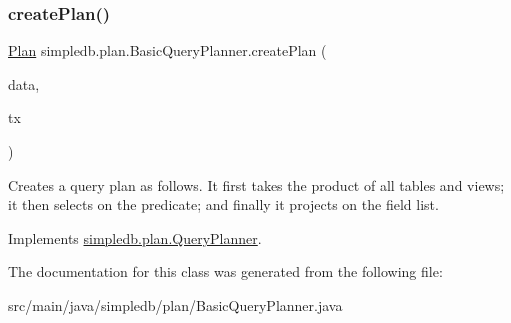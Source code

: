 \subsubsection{\texorpdfstring{create\+Plan()}{createPlan()}}
{\footnotesize\ttfamily \hyperlink{interfacesimpledb_1_1plan_1_1Plan}{Plan} simpledb.\+plan.\+Basic\+Query\+Planner.\+create\+Plan (\begin{DoxyParamCaption}\item[{\hyperlink{classsimpledb_1_1parse_1_1QueryData}{Query\+Data}}]{data,  }\item[{\hyperlink{classsimpledb_1_1tx_1_1Transaction}{Transaction}}]{tx }\end{DoxyParamCaption})\hspace{0.3cm}{\ttfamily [inline]}}

Creates a query plan as follows. It first takes the product of all tables and views; it then selects on the predicate; and finally it projects on the field list. 

Implements \hyperlink{interfacesimpledb_1_1plan_1_1QueryPlanner_a3fcc576e66a155bdc11845ec3e95838f}{simpledb.\+plan.\+Query\+Planner}.



The documentation for this class was generated from the following file\+:\begin{DoxyCompactItemize}
\item 
src/main/java/simpledb/plan/Basic\+Query\+Planner.\+java\end{DoxyCompactItemize}
